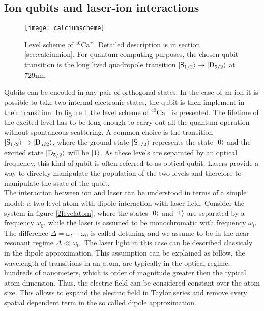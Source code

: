 \subsection{Ion qubits and laser-ion interactions}
\label{laserioninteractions}
\begin{figure}
\centering
\texttt{[image: calciumscheme]}
\caption{Level scheme of $^{40}\text{Ca}^+$. Detailed description is in section \ref{sec:calciumion}. For quantum computing purposes, the chosen qubit transition is the long lived quadropole transition $\ket{\text{S}_{1/2}} \to \ket{\text{D}_{5/2}}$ at 729nm.}
\label{qubitschemereference}
\end{figure}

Qubits can be encoded in any pair of orthogonal states. In the case of an ion it is possible to take two internal electronic states, the qubit is then implement in their transition. In figure \ref{qubitschemereference} the level scheme of $^{40}\text{Ca}^+$ is presented. The lifetime of the excited level has to be long enough to carry out all the quantum operation without spontaneous scattering. A common choice is the transition $\ket{\text{S}_{1/2}} \to \ket{\text{D}_{5/2}}$, where the ground state $\ket{\text{S}_{1/2}}$ represents the state $\ket{0}$ and the excited state $\ket{\text{D}_{5/2}}$ will be $\ket{1}$. As these levels are separated by an optical frequency, this kind of qubit is often referred to as optical qubit. Lasers provide a way to directly manipulate the population of the two levels and therefore to manipulate the state of the qubit.\\
The interaction between ion and laser can be understood in terms of a simple model: a two-level atom with dipole interaction with laser field. Consider the system in figure \ref{2levelatom}, where the states $\ket{0}$ and $\ket{1}$ are separated by a frequency $\omega_0$, while the laser is assumed to be monochromatic with frequency $\omega_l$. The difference $\Delta = \omega_l -\omega_0$ is called detuning and we assume to be in the near resonant regime $\Delta \ll \omega_0$. The laser light in this case can be described classicaly in the dipole approximation.
This assumption can be explained as follow, the wavelength of transitions in an atom, are typically in the optical regime: hundreds of nanometers, which is order of magnitude greater then the typical atom dimension. Thus, the electric field can be considered constant over the atom size. This allows to expand the electric field in Taylor series and remove every spatial dependent term in the so called dipole approximation.
